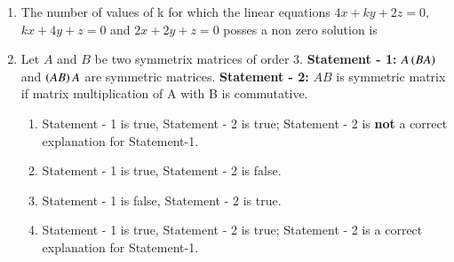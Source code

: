 \documentclass[journal,12pt,twocolumn]{IEEEtran}
\theoremstyle{remark}
\begin{document}
\begin{enumerate}
    \item The number of values of k for which the linear equations $4x + ky + 2z = 0$, $kx + 4y + z = 0$ and $2x + 2y + z=0$ posses a non zero solution is 
	\hfill{}
        \begin{enumerate}[label={(\alph*)}]
        \end{enumerate}

    \item Let $A$ and $B$ be two symmetrix matrices of order $3$.
	\newline
	\textbf{Statement - 1:} $A\left(BA\right)$ and $\left(AB\right)A$ are symmetric matrices. 
	\newline
	\textbf{Statement - 2:} $AB$ is symmetric matrix if matrix multiplication of A with B is commutative.

	\begin{enumerate}[label={(\alph*)}]
		\item Statement - 1 is true, Statement - 2 is true; Statement - 2 is \textbf{not} a correct explanation for Statement-1. 
	    	\item Statement - 1 is true, Statement - 2 is false. 
	    	\item Statement - 1 is false, Statement - 2 is true.
	    	\item Statement - 1 is true, Statement - 2 is true; Statement - 2 is a correct explanation for Statement-1. 
	\end{enumerate}


\end{enumerate}
\end{document}
